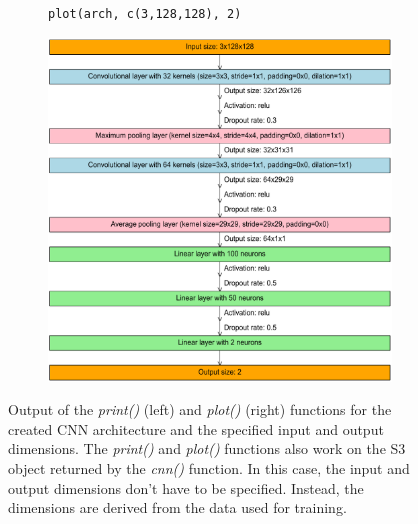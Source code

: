 \documentclass[12pt,twoside]{scrreport}
\newcommand{\fn}[2][]{\textit{#2(}#1\textit{)}}
\begin{document}
\begin{figure}[t]
\begin{subfigure}{0.47\textwidth}
		\centering
		\vspace*{0.2cm}
		\newsavebox{\plotbox} %
		\begin{lrbox}{\plotbox}
			\begin{lstlisting}[basicstyle=\footnotesize]
plot(arch, c(3,128,128), 2)
			\end{lstlisting}
		\end{lrbox}
		\fbox{\usebox{\plotbox}}
		\newline
		\vspace*{0.04cm}
		\includegraphics[width=\textwidth]{plot.pdf}
	\end{subfigure}
	\caption{Output of the \fn{print} (left) and \fn{plot} (right) functions for the created CNN architecture and the specified input and output dimensions. The \fn{print} and \fn{plot} functions also work on the S3 object returned by the \fn{cnn} function. In this case, the input and output dimensions don't have to be specified. Instead, the dimensions are derived from the data used for training.}
	\label{printplot}
\end{figure}
\end{document}
